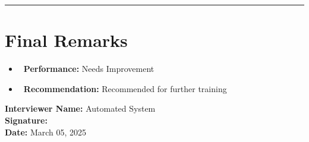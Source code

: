 \documentclass[a4paper,12pt]{article}
\newcommand{\sectionline}{\noindent\rule{\linewidth}{1pt}}
\begin{document}
\sectionline

\newpage
\section*{Final Remarks}
\begin{itemize}
    \item \textbf{\faUser\ Performance:} Needs Improvement
    \item \textbf{\faGraduationCap\ Recommendation:} Recommended for further training
\end{itemize}

\vspace{2em}
\noindent\textbf{Interviewer Name:} Automated System \\
\textbf{Signature:} \makebox[3cm]{\hrulefill} \\
\textbf{Date:} March 05, 2025
\end{document}
